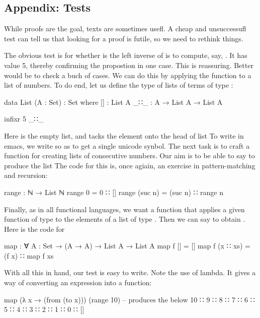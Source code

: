 \subsection{Appendix: Tests}

While proofs are the goal, texts are sometimes usefl.  A cheap and unsuccessufl test can tell us that looking for a proof is futile, so we need to rethink things.

The obvious test is for whether  is the left inverse of  is to compute, say, .  It has value 5, thereby confirming the propostion in one case. This is reassuring. Better would be to check a buch of cases.  We can do this by applying the function   to a list of numbers.  To do end, let us define the type of lists of terms of type :

\begin{colored}[elm]
data List (A : Set) : Set where
  []  : List A
  _∷_ : A → List A → List A

infixr 5 _∷_
\end{colored}

Here \ccode{[]} is the empty list, and   tacks the element  onto the head of list   To write \ccode{::} in emacs, we write \code{\bs{::}} so as to get a single unicode synbol.  The next task is to craft a function  for creating lists of consecutive numbers.  Our aim is to be able to say  to produce the list  The code for this is, once agiain, an exercise in pattern-matching and recursion:

\begin{colored}[elm]
range : ℕ → List ℕ
range 0 = 0 ∷ []
range (suc n) = (suc n) ∷ range n
\end{colored}

Finally, as in all functional languages, we want a function  that applies a given function of type  to the elements of a list of type .  Then we can say  to obtain . Here is the code for 


\begin{colored}[elm]
map : ∀ {A : Set} → (A → A) → List A → List A
map f [] = []
map f (x ∷ xs) = (f x) ∷ map f xs
\end{colored}

With all this in hand, our test is easy to write.  Note the use of lambda.  It gives a way of converting an expression into a function:

\begin{colored}[elm]
map (λ x → (from (to x))) (range 10)
-- produces the below
10 ∷ 9 ∷ 8 ∷ 7 ∷ 6 ∷ 5 ∷ 4 ∷ 3 ∷ 2 ∷ 1 ∷ 0 ∷ []
\end{colored}